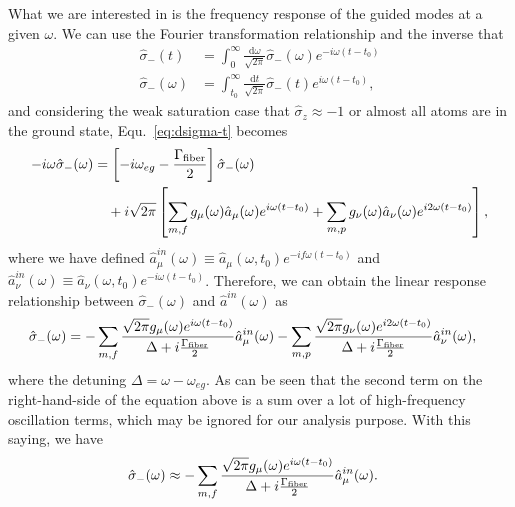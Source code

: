 \documentclass[preprint,aps,pra,onecolumn]{revtex4-1} %
\begin{document}
What we are interested in is the frequency response of the guided modes at a given $\omega$. We can use the Fourier transformation relationship and the inverse that 
\begin{align}
\hat{\sigma}_-(t) &= \int_0^{\infty} \frac{\mathrm{d}\omega}{\sqrt{2\pi}} \hat{\sigma}_-(\omega) e^{-i\omega (t-t_0)}\\
\hat{\sigma}_-(\omega) &= \int_{t_0}^{\infty} \frac{\mathrm{d}t}{\sqrt{2\pi}} \hat{\sigma}_-(t) e^{i\omega (t-t_0)},
\end{align}
and considering the weak saturation case that $\hat{\sigma}_z\approx -1$ or almost all atoms are in the ground state, Equ.~\ref{eq:dsigma-t} becomes
\begin{align}
-i\omega \hat{\sigma}_-(\omega) &= \left[-i\omega_{eg}-\frac{\Gamma_{\rm fiber}}{2} \right]\hat{\sigma}_-(\omega) \nonumber\\
&\quad +i\sqrt{2\pi}\left[ \sum_{m,f} g_\mu(\omega) \hat{a}_\mu(\omega)e^{i\omega(t-t_0)}+\sum_{m,p} g_\nu(\omega) \hat{a}_\nu(\omega)e^{i2\omega(t-t_0)}\right],
\end{align}
where we have defined $\hat{a}^{in}_\mu(\omega)\equiv \hat{a}_\mu(\omega, t_0)e^{-if\omega(t-t_0)}$ and $\hat{a}^{in}_\nu(\omega)\equiv \hat{a}_\nu(\omega, t_0)e^{-i\omega(t-t_0)}$. 
Therefore, we can obtain the linear response relationship between $\hat{\sigma}_-(\omega)$ and $\hat{a}^{in}(\omega)$ as
\begin{align}\label{eq:sigma-ain0}
\hat{\sigma}_-(\omega) &= -\sum_{m,f} \frac{\sqrt{2\pi}g_\mu(\omega)e^{i\omega(t-t_0)}}{\Delta+i\frac{\Gamma_{\rm fiber}}{2}}\hat{a}^{in}_\mu(\omega)-\sum_{m,p} \frac{\sqrt{2\pi}g_\nu(\omega)e^{i2\omega(t-t_0)}}{\Delta+i\frac{\Gamma_{\rm fiber}}{2}}\hat{a}^{in}_\nu(\omega),
\end{align}
where the detuning $\Delta=\omega-\omega_{eg}$. As can be seen that the second term on the right-hand-side of the equation above is a sum over a lot of high-frequency oscillation terms, which may be ignored for our analysis purpose. With this saying, we have 
\begin{align}\label{eq:sigma-ain}
\hat{\sigma}_-(\omega) &\approx -\sum_{m,f} \frac{\sqrt{2\pi}g_\mu(\omega)e^{i\omega(t-t_0)}}{\Delta+i\frac{\Gamma_{\rm fiber}}{2}}\hat{a}^{in}_\mu(\omega).
\end{align}
\end{document}
